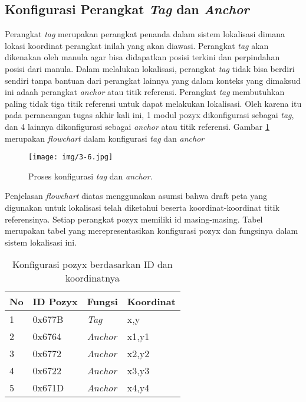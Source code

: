 \subsection{Konfigurasi Perangkat \textit{Tag} dan \textit{Anchor}}
\vspace{1ex}

Perangkat \textit{tag} merupakan perangkat penanda dalam sistem lokalisasi dimana lokasi koordinat perangkat inilah yang akan diawasi. Perangkat \textit{tag} akan dikenakan oleh manula agar bisa didapatkan posisi terkini dan perpindahan posisi dari manula. Dalam melalukan lokalisasi, perangkat \textit{tag} tidak bisa berdiri sendiri tanpa bantuan dari perangkat lainnya yang dalam konteks yang dimaksud ini adaah perangkat \textit{anchor} atau titik referensi. Perangkat \textit{tag} membutuhkan paling tidak tiga titik referensi untuk dapat melakukan lokalisasi. Oleh karena itu pada perancangan tugas akhir kali ini, 1 modul pozyx dikonfigurasi sebagai \textit{tag}, dan 4 lainnya dikonfigurasi sebagai \textit{anchor} atau titik referensi. Gambar \ref{fig:3_6} merupakan \textit{flowchart} dalam konfigurasi \textit{tag} dan \textit{anchor}
\begin{figure} [!htb]
	\captionsetup{justification=centering}
	\texttt{[image: img/3-6.jpg]}
	\caption{Proses konfigurasi \textit{tag} dan \textit{anchor}.}
	\label{fig:3_6}
\end{figure}
Penjelasan \textit{flowchart} diatas menggunakan asumsi bahwa draft peta yang digunakan untuk lokalisasi telah diketahui beserta koordinat-koordinat titik referensinya. Setiap perangkat pozyx memiliki id masing-masing. Tabel  merupakan tabel yang merepresentasikan konfigurasi pozyx dan fungsinya dalam sistem lokalisasi ini.
\begin{table}[]
	\caption{Konfigurasi pozyx berdasarkan ID dan koordinatnya}
	\label{tab:pozyx}
	\begin{tabular}{|l|l|l|l|}
		\hline
		\textbf{No} & \textbf{ID Pozyx} & \textbf{Fungsi} & \textbf{Koordinat} \\ \hline
		1 & 0x677B & \textit{Tag} & x,y \\ \hline
		2 & 0x6764 & \textit{Anchor} & x1,y1 \\ \hline
		3 & 0x6772 & \textit{Anchor} & x2,y2 \\ \hline
		4 & 0x6722 & \textit{Anchor} & x3,y3 \\ \hline
		5 & 0x671D & \textit{Anchor} & x4,y4 \\ \hline
	\end{tabular}
\end{table}
